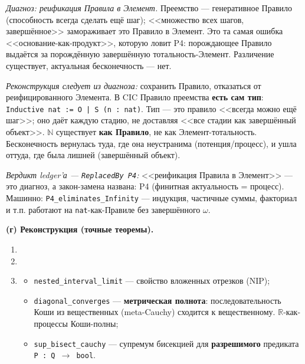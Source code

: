 \documentclass[11pt,a4paper]{article}
\begin{document}
\emph{Диагноз: реификация Правила в Элемент.} Преемство --- генеративное Правило (способность всегда сделать ещё шаг); <<множество всех шагов, завершённое>> замораживает это Правило в Элемент. Это та самая ошибка <<основание-как-продукт>>, которую ловит P4: порождающее Правило выдаётся за порождённую завершённую тотальность-Элемент. Различение существует, актуальная бесконечность --- нет.

\emph{Реконструкция следует из диагноза:} сохранить Правило, отказаться от реифицированного Элемента. В CIC Правило преемства \textbf{есть сам тип}: \texttt{Inductive nat := O | S (n : nat)}. Тип --- это правило <<всегда можно ещё шаг>>; оно даёт каждую стадию, не доставляя <<все стадии как завершённый объект>>. $\mathbb{N}$ существует \textbf{как Правило}, не как Элемент-тотальность. Бесконечность вернулась туда, где она неустранима (потенция/процесс), и ушла оттуда, где была лишней (завершённый объект).

\emph{Вердикт ledger'а --- \texttt{Replaced\allowbreak{}By P4}:} <<реификация Правила в Элемент>> --- это диагноз, а закон-замена названа: P4 (финитная актуальность = процесс). Машинно: \texttt{P4\_\allowbreak{}eliminates\_\allowbreak{}Infinity} --- индукция, частичные суммы, факториал и т.п. работают на \texttt{nat}-как-Правиле без завершённого $\omega$.

\textbf{(г) Реконструкция (точные теоремы).}
\begin{enumerate}
\item 
\item 
\item 
\begin{itemize}
\item \texttt{nested\_\allowbreak{}interval\_\allowbreak{}limit} --- свойство вложенных отрезков (NIP);
\item \texttt{diagonal\_\allowbreak{}converges} --- \textbf{метрическая полнота}: последовательность Коши из вещественных (meta-Cauchy) сходится к вещественному. $\mathbb{R}$-как-процессы Коши-полны;
\item \texttt{sup\_\allowbreak{}bisect\_\allowbreak{}cauchy} --- супремум бисекцией для \textbf{разрешимого} предиката \texttt{P : Q $\to$ bool}.
\end{itemize}
\end{enumerate}
\end{document}
